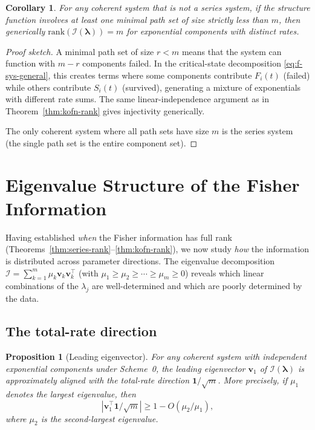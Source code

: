 \documentclass[12pt]{article}
\newtheorem{proposition}[theorem]{Proposition}
\newtheorem{corollary}[theorem]{Corollary}
\theoremstyle{definition}
\theoremstyle{remark}
\newcommand{\rank}{\mathrm{rank}}
\newcommand{\bone}{\mathbf{1}}
\newcommand{\blam}{\boldsymbol{\lambda}}
\begin{document}
\begin{corollary}\label{cor:general-coherent}
For any coherent system that is not a series system, if the structure
function involves at least one minimal path set of size strictly less
than $m$, then generically $\rank(\mathcal{I}(\blam)) = m$ for
exponential components with distinct rates.
\end{corollary}

\begin{proof}[Proof sketch]
A minimal path set of size $r < m$ means that the system can function
with $m - r$ components failed.  In the critical-state decomposition
\eqref{eq:f-sys-general}, this creates terms where some components
contribute $F_i(t)$ (failed) while others contribute $S_i(t)$
(survived), generating a mixture of exponentials with different
rate sums.  The same linear-independence argument as in
Theorem~\ref{thm:kofn-rank} gives injectivity generically.

The only coherent system where all path sets have size $m$ is the
series system (the single path set is the entire component set).
\end{proof}


\section{Eigenvalue Structure of the Fisher Information}
\label{sec:eigenvalue}

Having established \emph{when} the Fisher information has full rank
(Theorems~\ref{thm:series-rank}--\ref{thm:kofn-rank}), we now study
\emph{how} the information is distributed across parameter directions.
The eigenvalue decomposition
$\mathcal{I} = \sum_{k=1}^m \mu_k \mathbf{v}_k \mathbf{v}_k^\top$
(with $\mu_1 \geq \mu_2 \geq \cdots \geq \mu_m \geq 0$) reveals
which linear combinations of the $\lambda_j$ are well-determined and
which are poorly determined by the data.

\subsection{The total-rate direction}
\label{sec:total-rate}

\begin{proposition}[Leading eigenvector]
\label{prop:leading-ev}
For any coherent system with independent exponential components under
Scheme~0, the leading eigenvector $\mathbf{v}_1$ of
$\mathcal{I}(\blam)$ is approximately aligned with the total-rate
direction $\bone / \sqrt{m}$.  More precisely, if $\mu_1$ denotes
the largest eigenvalue, then
\begin{equation}\label{eq:leading-ev-bound}
  |\mathbf{v}_1^\top \bone / \sqrt{m}| \geq 1 - O(\mu_2 / \mu_1),
\end{equation}
where $\mu_2$ is the second-largest eigenvalue.
\end{proposition}
\end{document}
